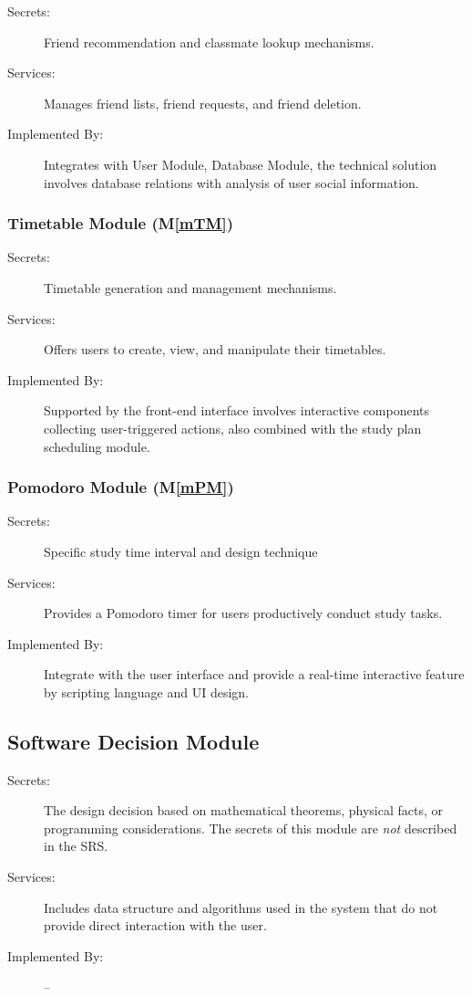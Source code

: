 \documentclass[12pt, titlepage]{article}
\newcommand{\mref}[1]{M\ref{#1}}
\begin{document}
\begin{description}
\item[Secrets:]Friend recommendation and classmate lookup mechanisms.
\item[Services:] Manages friend lists, friend requests, and friend deletion.
\item[Implemented By:] Integrates with User Module, Database Module, the technical solution involves database relations with analysis of user social information. 
\end{description}
\subsubsection{Timetable Module (\mref{mTM})}

\begin{description}
\item[Secrets:] Timetable generation and management mechanisms.
\item[Services:] Offers users to create, view, and manipulate their timetables. 
\item[Implemented By:] Supported by the front-end interface involves interactive components collecting user-triggered actions, also combined with the study plan scheduling module.   
\end{description}

\subsubsection{Pomodoro Module (\mref{mPM})}

\begin{description}
\item[Secrets:] Specific study time interval and design technique
\item[Services:] Provides a Pomodoro timer for users productively conduct study tasks. 
\item[Implemented By:] Integrate with the user interface and provide a real-time interactive feature by scripting language and UI design.
\end{description}



\subsection{Software Decision Module}

\begin{description}
\item[Secrets:] The design decision based on mathematical theorems, physical
  facts, or programming considerations. The secrets of this module are
  \emph{not} described in the SRS.
\item[Services:] Includes data structure and algorithms used in the system that
  do not provide direct interaction with the user. 
\item[Implemented By:] --
\end{description}
\end{document}
